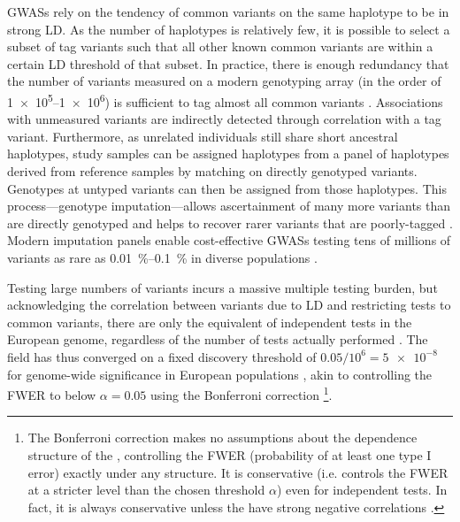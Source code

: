 \glspl{GWAS} rely on the tendency of common variants on the same haplotype to be in strong \gls{LD}.
As the number of haplotypes is relatively few, 
it is possible to select a subset of tag variants such that all other known common variants are within a certain \gls{LD} threshold of that subset. 
In practice, there is enough redundancy that the number of variants measured on a modern genotyping array (in the order of \numrange[retain-unity-mantissa=false]{1e5}{1e6}) is sufficient to tag almost all common variants  \autocite{theinternationalhapmapconsortium2005HaplotypeMapHuman,barrett2006EvaluatingCoverageGenomewide}.
Associations with unmeasured variants are indirectly detected through correlation with a tag variant.
Furthermore, as unrelated individuals still share short ancestral haplotypes, 
study samples can be assigned haplotypes from a panel of haplotypes derived from reference samples by matching on directly genotyped variants. 
Genotypes at untyped variants can then be assigned from those haplotypes.
This process---genotype imputation---allows ascertainment of many more variants than are directly genotyped \autocite{das2018GenotypeImputationLarge} and helps to recover rarer variants that are poorly-tagged \autocite{visscher201710YearsGWAS}.
Modern imputation panels enable cost-effective \glspl{GWAS} testing tens of millions of variants as rare as \SIrange[parse-numbers=false]{0.01}{0.1}{\percent} in diverse populations \autocite{taliun2019Sequencing53831}.

Testing large numbers of variants incurs a massive multiple testing burden, 
but acknowledging the correlation between variants due to \gls{LD} and restricting tests to common variants, 
there are only the equivalent of  independent tests in the European genome, 
regardless of the number of tests actually performed \autocite{peer2008EstimationMultipleTesting}.
The field has thus converged on a fixed discovery threshold of $0.05 / 10^6 = \num{5e-8}$ for genome-wide significance in European populations \autocite{jannot2015108HasEmerged}, akin to controlling the \gls{FWER} to below $\alpha = 0.05$ using the Bonferroni correction%
\footnote{
    The Bonferroni correction makes no assumptions about the dependence structure of the \pvalues{}, controlling the \gls{FWER} (probability of at least one type I error) exactly under any structure.
    It is conservative (i.e. controls the \gls{FWER} at a stricter level than the chosen threshold $\alpha$) even for independent tests. 
    In fact, it is always conservative unless the \pvalues{} have strong negative correlations \autocite{goeman2014MultipleHypothesisTesting}.
}.

